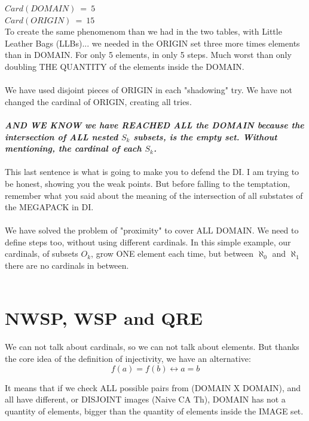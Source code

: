 		\noindent
		$ Card(DOMAIN) \: = \: 5 $\\
		$ Card(ORIGIN) \: = \: 15 $ \\
		To create the same phenomenom than we had in the two tables, with Little Leather Bags (LLBs)... we needed in the ORIGIN set three more times elements than in DOMAIN. For only 5 elements, in only 5 steps. Much worst than only doubling THE QUANTITY of the elements inside the DOMAIN.
		\\\\
		
		\noindent
		We have used disjoint pieces of ORIGIN in each "shadowing" try. We have not changed the cardinal of ORIGIN, creating all tries.
		\\\\
		
		\noindent
		\textit{\textbf{AND WE KNOW we have REACHED ALL the DOMAIN because the intersection of ALL nested $S_{k}$ subsets, is the empty set. Without mentioning, the cardinal of each $S_{k}$.}}
		\\\\
		
		\noindent
		This last sentence is what is going to make you to defend the DI. I am trying to be honest, showing you the weak points. But before falling to the temptation, remember what you said about the meaning of the intersection of all substates of the MEGAPACK in DI.
		\\\\
		
		\noindent
		We have solved the problem of "proximity" to cover ALL DOMAIN. We need to define steps too, without using different cardinals. In this simple example, our cardinals, of subsets $O_{k}$, grow ONE element each time, but between $\aleph_{0}$ and $\aleph_{1}$ there are no cardinals in between.
		\\\\
		
	\newpage
	\section{NWSP, WSP and QRE}
		
		\noindent
		We can not talk about cardinals, so we can not talk about elements. But thanks the core idea of the definition of injectivity, we have an alternative:\\
		$$f(a) = f(b) \leftrightarrow a=b$$
		
		\noindent
		It means that if we check ALL possible pairs from (DOMAIN X DOMAIN), and all have different, or DISJOINT images (Naive CA Th), DOMAIN has not a quantity of elements, bigger than the quantity of elements inside the IMAGE set.
		\\\\
		
